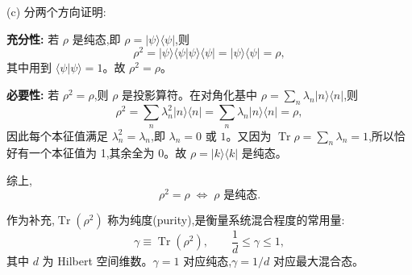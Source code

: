 \begin{solution}
(c) 分两个方向证明:

\textbf{充分性:} 若 $\rho$ 是纯态,即 $\rho = |\psi\rangle\langle\psi|$,则
\[
\rho^2 = |\psi\rangle\langle\psi|\psi\rangle\langle\psi| = |\psi\rangle\langle\psi| = \rho,
\]
其中用到 $\langle\psi|\psi\rangle=1$。故 $\rho^2 = \rho$。

\textbf{必要性:} 若 $\rho^2 = \rho$,则 $\rho$ 是投影算符。在对角化基中 $\rho = \sum_n \lambda_n |n\rangle\langle n|$,则
\[
\rho^2 = \sum_n \lambda_n^2 |n\rangle\langle n| = \sum_n \lambda_n |n\rangle\langle n| = \rho,
\]
因此每个本征值满足 $\lambda_n^2 = \lambda_n$,即 $\lambda_n = 0$ 或 $1$。又因为 $\operatorname{Tr}\rho = \sum_n \lambda_n = 1$,所以恰好有一个本征值为 1,其余全为 0。故 $\rho = |k\rangle\langle k|$ 是纯态。

综上,
\[
\boxed{\rho^2 = \rho \;\Longleftrightarrow\; \rho \text{ 是纯态}.}
\]

作为补充,$\operatorname{Tr}(\rho^2)$ 称为纯度(purity),是衡量系统混合程度的常用量:
\[
\gamma \equiv \operatorname{Tr}(\rho^2),\qquad \frac{1}{d} \le \gamma \le 1,
\]
其中 $d$ 为 Hilbert 空间维数。$\gamma=1$ 对应纯态,$\gamma=1/d$ 对应最大混合态。
\end{solution}

